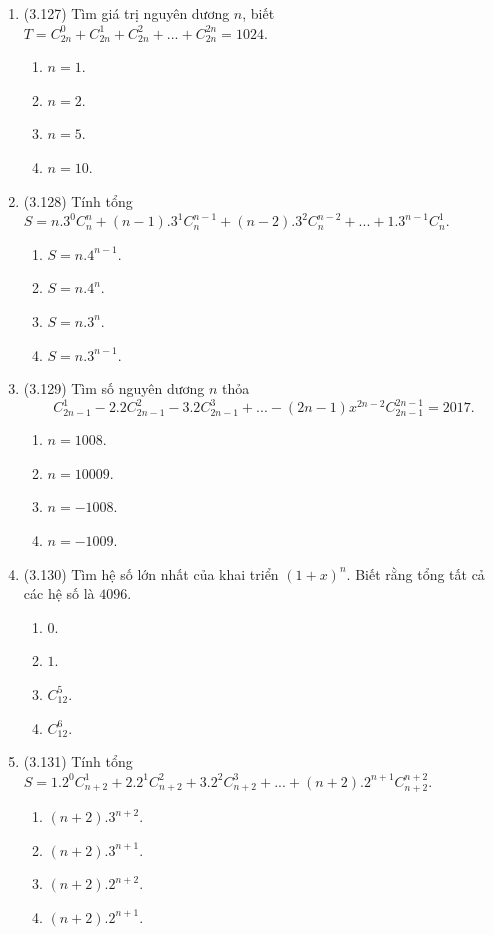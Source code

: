 \begin{enumerate}[label=\textbf{Câu \arabic*.},align=left,left=0cm..0cm,itemindent=*]
\begin{enumerate}[label=\textbf{\Alph*.},align=left,left=1cm..0cm,itemindent=*]
	\end{enumerate}
	\item (3.127) Tìm giá trị nguyên dương $n$, biết $T=C_{2n}^0+C_{2n}^1+C_{2n}^2+...+C_{2n}^{2n}=1024$.
	\begin{enumerate}[label=\textbf{\Alph*.},align=left,left=1cm..0cm,itemindent=*]
	    \item $n=1$. \item $n=2$. \item $n=5$. \item $n=10$.
	\end{enumerate}
	\item (3.128) Tính tổng $S=n.3^0C_n^n+(n-1).3^1C_n^{n-1}+(n-2).3^2C_n^{n-2}+...+1.3^{n-1}C_n^1$.
	\begin{enumerate}[label=\textbf{\Alph*.},align=left,left=1cm..0cm,itemindent=*]
	    \item $S=n.4^{n-1}$. \item $S=n.4^n$. \item $S=n.3^n$. \item $S=n.3^{n-1}$.
	\end{enumerate}
	\item (3.129) Tìm số nguyên dương $n$ thỏa $$C_{2n-1}^1-2.2C_{2n-1}^2-3.2C_{2n-1}^3+...-(2n-1)x^{2n-2}C_{2n-1}^{2n-1}=2017.$$
	\begin{enumerate}[label=\textbf{\Alph*.},align=left,left=1cm..0cm,itemindent=*]
	    \item $n=1008$. \item $n=10009$. \item $n=-1008$. \item $n=-1009$.
	\end{enumerate}
	\item (3.130) Tìm hệ số lớn nhất của khai triển $(1+x)^n$. Biết rằng tổng tất cả các hệ số là $4096$.
	\begin{enumerate}[label=\textbf{\Alph*.},align=left,left=1cm..0cm,itemindent=*]
	    \item $0$. \item $1$. \item $C_{12}^5$. \item $C_{12}^6$.
	\end{enumerate}
	\item (3.131) Tính tổng $S=1.2^0C_{n+2}^1+2.2^1C_{n+2}^2+3.2^2C_{n+2}^3+...+(n+2).2^{n+1}C_{n+2}^{n+2}$.
	\begin{enumerate}[label=\textbf{\Alph*.},align=left,left=1cm..0cm,itemindent=*]
		\item $(n+2).3^{n+2}$. \item $(n+2).3^{n+1}$. \item $(n+2).2^{n+2}$. \item $(n+2).2^{n+1}$.
	\end{enumerate}
\end{enumerate}\par

